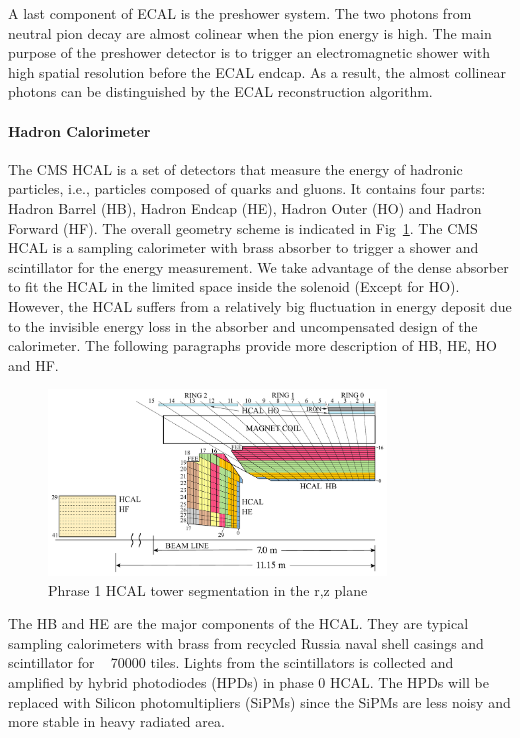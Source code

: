 A last component of ECAL is the preshower system. The two photons from neutral pion decay are almost colinear when the pion energy is high. The main purpose of the preshower detector is to trigger an electromagnetic shower with high spatial resolution before the ECAL endcap. As a result, the almost collinear photons can be distinguished by the ECAL reconstruction algorithm. 

\paragraph{Hadron Calorimeter}

The CMS HCAL is a set of detectors that measure the energy of hadronic particles, i.e., particles composed of quarks and gluons. It contains four parts: Hadron Barrel (HB), Hadron Endcap (HE), Hadron Outer (HO) and Hadron Forward (HF). The overall geometry scheme is indicated in Fig~\ref{fig:c3cms2dhcal}. The CMS HCAL is a sampling calorimeter with brass absorber to trigger a shower and scintillator for the energy measurement. We take advantage of the dense absorber to fit the HCAL in the limited space inside the solenoid (Except for HO). However, the HCAL suffers from a relatively big fluctuation in energy deposit due to the invisible energy loss in the absorber and uncompensated design of the calorimeter. The following paragraphs provide more description of HB, HE, HO and HF.

\begin{figure}[htbp]
 \begin{center}
  \includegraphics[width=0.8\textwidth]{figures/c3/c3_cms_2dhcal.pdf}
 \end{center}
 \caption{Phrase 1 HCAL tower segmentation in the r,z plane}
 \label{fig:c3cms2dhcal}
\end{figure}

The HB and HE are the major components of the HCAL. They are typical sampling calorimeters with brass from recycled Russia naval shell casings and scintillator for ~ 70000 tiles. Lights from the scintillators is collected and amplified by hybrid photodiodes (HPDs) in phase 0 HCAL. The HPDs will be replaced with Silicon photomultipliers (SiPMs) since the SiPMs are less noisy and more stable in heavy radiated area. 

